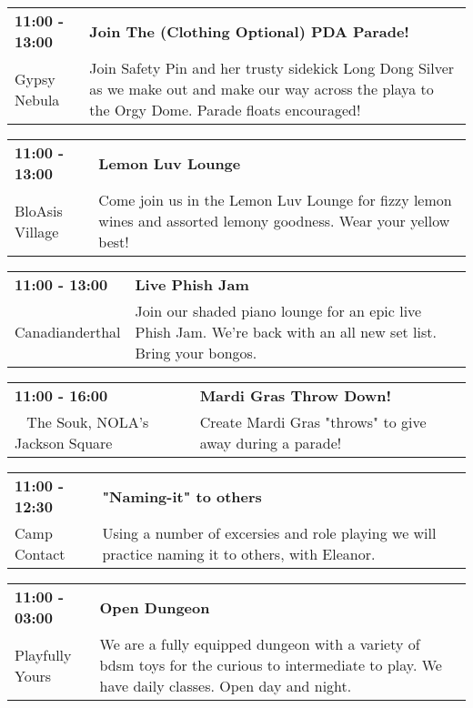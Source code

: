 \begin{tabular}{ p{1in} p{2.2in} }
    \textbf{11:00 - 13:00} & \textbf{Join The (Clothing Optional) PDA Parade!} \\
    Gypsy Nebula \newline  & Join Safety Pin and her trusty sidekick Long Dong Silver as we make out and make our way across the playa to the Orgy Dome. Parade floats encouraged! \\
    \hline 
\end{tabular}
    
\begin{tabular}{ p{1in} p{2.2in} }
    \textbf{11:00 - 13:00} & \textbf{Lemon Luv Lounge} \\
    BloAsis Village \newline  & Come join us in the Lemon Luv Lounge for fizzy lemon wines and assorted lemony goodness.  Wear your yellow best! \\
    \hline 
\end{tabular}
    
\begin{tabular}{ p{1in} p{2.2in} }
    \textbf{11:00 - 13:00} & \textbf{Live Phish Jam} \\
    Canadianderthal \newline  & Join our shaded piano lounge for an epic live Phish Jam. We're back with an all new set list. Bring your bongos. \\
    \hline 
\end{tabular}
    
\begin{tabular}{ p{1in} p{2.2in} }
    \textbf{11:00 - 16:00} & \textbf{Mardi Gras Throw Down!} \\
    ~ \newline The Souk, NOLA's Jackson Square  & Create Mardi Gras "throws" to give away during a parade! \\
    \hline 
\end{tabular}
    
\begin{tabular}{ p{1in} p{2.2in} }
    \textbf{11:00 - 12:30} & \textbf{"Naming-it" to others} \\
    Camp Contact \newline  & Using a number of excersies and role playing we will practice naming it to others, with Eleanor. \\
    \hline 
\end{tabular}
    
\begin{tabular}{ p{1in} p{2.2in} }
    \textbf{11:00 - 03:00} & \textbf{Open Dungeon} \\
    Playfully Yours \newline  & We are a fully equipped dungeon with a variety of bdsm toys for the curious to intermediate to play. We have daily classes. Open day and night. \\
    \hline 
\end{tabular}
    
